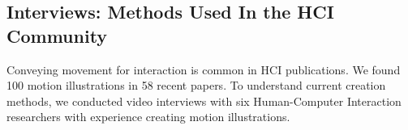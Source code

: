 





\subsection{Interviews: Methods Used In the HCI Community}
Conveying movement for interaction is common in HCI publications. We found 100 motion illustrations in 58 recent papers.
%
To understand current creation methods, we conducted video interviews with six Human-Computer Interaction researchers with experience creating motion illustrations.


%

